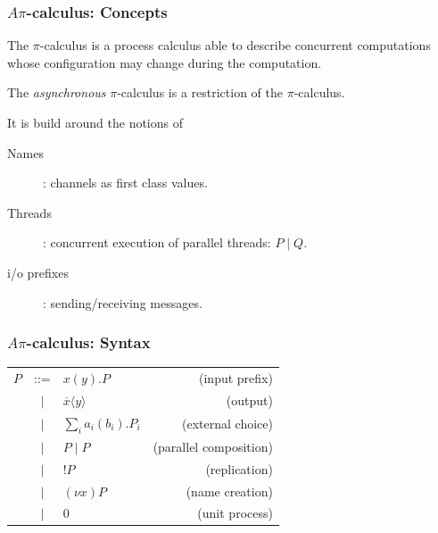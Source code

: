 \documentclass{beamer}
\theoremstyle{remark}
\theoremstyle{definition}
\begin{document}
\begin{frame}
\frametitle{$A\pi$-calculus: Concepts}

The $\pi$-calculus \cite{DBLP:journals/iandc/MilnerPW92a,DBLP:journals/iandc/MilnerPW92b} is a process calculus able to describe concurrent computations whose configuration may change during the computation.

The \textit{asynchronous} $\pi$-calculus \cite{DBLP:conf/ecoop/HondaT91,Boudol92asynchronyand} is a restriction of the $\pi$-calculus.

\vspace{5pt}
It is build around the notions of 
\begin{description}
\item[Names]: channels as first class values. %
\item[Threads]: concurrent execution of parallel threads: $P\;|\;Q$.
\item[i/o prefixes]: sending/receiving messages.
\end{description}
\end{frame}

\begin{frame}[label=piSyntax]
\frametitle{$A\pi$-calculus: Syntax}
\begin{tabular}{lclr}
$P$ & ::= & $x(y).P $                           & (input prefix)\\
    & $|$ & $\overline{x} \langle y \rangle $   & (output)\\
    & $|$ & $ \sum_i a_i(b_i).P_i $             & (external choice) \\
    & $|$ & $P\;|\;P $                          & (parallel composition)\\
    & $|$ & $!P $                               & (replication) \\
    & $|$ & $(\nu x)P $                         & (name creation)\\
    & $|$ & $0 $                                & (unit process)
\end{tabular}
\end{frame}
\end{document}
